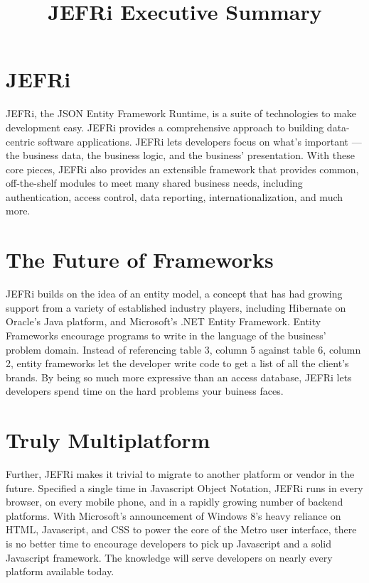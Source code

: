 \documentclass{article}
\begin{document}
\title{JEFRi Executive Summary}
\maketitle
\tableofcontents
\newpage
\linespread{1.6}

\section{JEFRi}
JEFRi, the JSON Entity Framework Runtime, is a suite of technologies to
make development easy. JEFRi provides a comprehensive approach to building
data-centric software applications. JEFRi lets developers focus on what's important
--- the business data, the business logic, and the business' presentation. With
these core pieces, JEFRi also provides an extensible framework that provides
common, off-the-shelf modules to meet many shared business needs, including
authentication, access control, data reporting, internationalization, and much
more.

\section{The Future of Frameworks}
JEFRi builds on the idea of an entity model, a concept that has had growing
support from a variety of established industry players, including Hibernate on
Oracle's Java platform, and Microsoft's .NET Entity Framework. Entity Frameworks
encourage programs to write in the language of the business' problem domain.
Instead of referencing table 3, column 5 against table 6, column 2, entity
frameworks let the developer write code to get a list of all the client's
brands. By being so much more expressive than an access database, JEFRi lets
developers spend time on the hard problems your buiness faces.

\section{Truly Multiplatform}
Further, JEFRi makes it trivial to migrate to another platform or vendor in the
future. Specified a single time in Javascript Object Notation, JEFRi runs in every browser, on every mobile
phone, and in a rapidly growing number of backend platforms. With Microsoft's
announcement of Windows 8's heavy reliance on HTML, Javascript, and CSS to power
the core of the Metro user interface, there is no better time to encourage developers
to pick up Javascript and a solid Javascript framework. The knowledge will serve
developers on nearly every platform available today.
\end{document}
